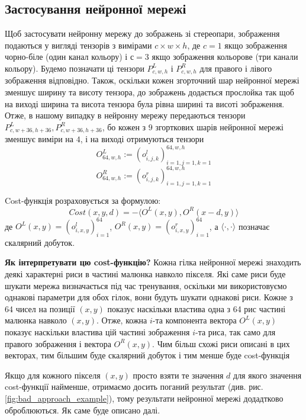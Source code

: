 \documentclass{article}
\theoremstyle{definition}
\begin{document}
\subsection{Застосування нейронної мережі}
Щоб застосувати нейронну мережу до зображень зі стереопари, зображення подаються у вигляді тензорів з вимірами $c \times w \times h$, де $c=1$ якщо зображення чорно-біле (один канал кольору) і $с=3$ якщо зображення кольорове (три канали кольору). Будемо позначати ці тензори $P^L_{c, w, h}$ і $P^R_{c, w, h}$ для правого і лівого зображення відповідно. Також, оскільки кожен згорточний шар нейронної мережі зменшує ширину та висоту тензора, до зображень додається прослойка так щоб на виході ширина та висота тензора була рівна ширині та висоті зображення. Отже, в нашому випадку в нейронну мережу передаються тензори $P^L_{c, w+36, h+36}, P^R_{c, w+36, h+36}$, бо кожен з $9$ згорткових шарів нейронної мережі зменшує виміри на $4$, і на виході отримуються тензори
\[ O^L_{64, w, h} := (o^l_{i,j,k})_{i=1,j=1,k=1}^{64,w,h} \]
\[ O^R_{64, w, h} := (o^r_{i,j,k})_{i=1,j=1,k=1}^{64,w,h} \]

Cost-функція розраховується за формулою:
\[ Cost(x, y, d) = - \langle O^L(x, y), O^R(x - d, y) \rangle \]
де $O^L(x, y) = (o^l_{i,x,y})_{i=1}^{64}$, $O^R(x, y) = (o^r_{i,x,y})_{i=1}^{64}$, а $\langle \cdot, \cdot \rangle$ позначає скалярний добуток.

\textbf{Як інтерпретувати цю cost-функцію?} Кожна гілка нейронної мережі знаходить деякі характерні риси в частині малюнка навколо пікселя. Які саме риси буде шукати мережа визначається під час тренування, оскільки ми використовуємо однакові параметри для обох гілок, вони будуть шукати однакові риси. Кожне з 64 чисел на позиції $(x, y)$ показує наскільки властива одна з 64 рис частині малюнка навколо $(x,y)$. Отже, кожна $i$-та компонента вектора $O^L(x,y)$ показує наскільки властива цій частині зображення $i$-та риса, так само для правого зображення і вектора $O^R(x,y)$. Чим більш схожі риси описані в цих векторах, тим більшим буде скалярний добуток і тим менше буде cost-функція

Якщо для кожного пікселя $(x,y)$ просто взяти те значення $d$ для якого значення cost-функції найменше, отримаємо досить поганий результат (див. рис. \ref{fig:bad_approach_example}), тому результати нейронної мережі додадтково оброблюються. Як саме буде описано далі.
\end{document}
